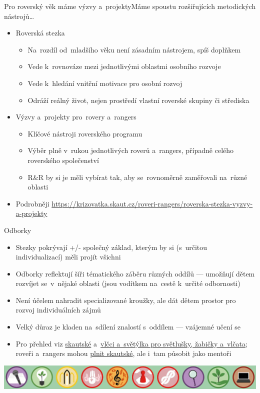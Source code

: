 \documentclass[compress, ucs, xelatex, 11pt, xcolor=dvipsnames, print, aspectratio=169,
	hyperref={
		bookmarks=true,
		unicode=true,
		colorlinks=true,
		pdftitle={Skautska vychovna metoda},
		plainpages=false,
		pdfauthor={Vojtech Zeisek},
		pdfsubject={Skautska vychovna metoda a jeji vyvoj za posledni stoleti a desetileti},
		pdfcreator={XeLaTeX},
		pdfkeywords={Junak, Pedagogika, Skaut, Skauting, Vychovna metoda},
		linkcolor=Red, %
		anchorcolor=ForestGreen, %
		citecolor=ForestGreen, %
		filecolor=ForestGreen, %
		menucolor=ForestGreen, %
		urlcolor=Sepia, %
		pdftex},
	url={hyphens, lowtilde} %
	]{beamer}
\begin{document}
\begin{frame}{Pro roverský věk máme výzvy a~projekty}{Máme spoustu rozšiřujících metodických nástrojů\ldots}
	\begin{itemize}
		\item Roverská stezka
		\begin{itemize}
			\item Na~rozdíl od~mladšího věku není zásadním nástrojem, spíš doplňkem
			\item Vede k~rovnováze mezi jednotlivými oblastmi osobního rozvoje
			\item Vede k~hledání vnitřní motivace pro osobní rozvoj
			\item Odráží reálný život, nejen prostředí vlastní roverské skupiny či střediska
		\end{itemize}
		\item Výzvy a~projekty pro~rovery a~rangers
		\begin{itemize}
			\item Klíčové nástroji roverského programu
			\item Výběr plně v~rukou jednotlivých roverů a~rangers, případně celého roverského společenství
			\item R\&R by si je měli vybírat tak, aby se~rovnoměrně zaměřovali na~různé oblasti
		\end{itemize}
		\item Podrobněji \url{https://krizovatka.skaut.cz/roveri-rangers/roverska-stezka-vyzvy-a-projekty}
	\end{itemize}
\end{frame}

\begin{frame}{Odborky}
	\begin{itemize}
		\item Stezky pokrývají +/- společný základ, kterým by si (s~určitou individualizací) měli projít všichni
		\item Odborky reflektují šíři tématického záběru různých oddílů --- umožňují dětem rozvíjet se~v~nějaké oblasti (jsou vodítkem na~cestě k~určité odbornosti)
		\item Není účelem nahradit specializované kroužky, ale dát dětem prostor pro rozvoj individuálních zájmů
		\item Velký důraz je kladen na~sdílení znalostí s~oddílem --- vzájemné učení se
		\item Pro přehled viz \href{https://odborky.skaut.cz/}{skautské} a~\href{https://vlcciasvetylka.skaut.cz/}{vlčci a~světýlka pro světlušky, žabičky a~vlčata}; roveři a~rangers mohou \href{https://krizovatka.skaut.cz/roveri-rangers/odborky-pro-rovery-a-rangers}{plnit skautské}, ale i~tam působit jako mentoři
	\end{itemize}
	\begin{center}
		\includegraphics[width=\textwidth]{odborky.jpg}
	\end{center}
\end{frame}
\end{document}
